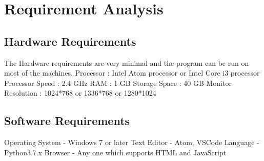 \chapter{Requirement Analysis}
\section{Hardware Requirements}

The Hardware requirements are very minimal and the program can be run on most of
the machines. 
Processor : Intel Atom processor or Intel Core i3 processor
Processor Speed : 2.4 GHz
RAM : 1 GB
Storage Space : 40 GB
Monitor Resolution : 1024*768 or 1336*768 or 1280*1024


\section{Software Requirements}

Operating System - Windows 7 or later
Text Editor - Atom, VSCode
Language - Python3.7.x
Browser - Any one which supports HTML and JavaScript

